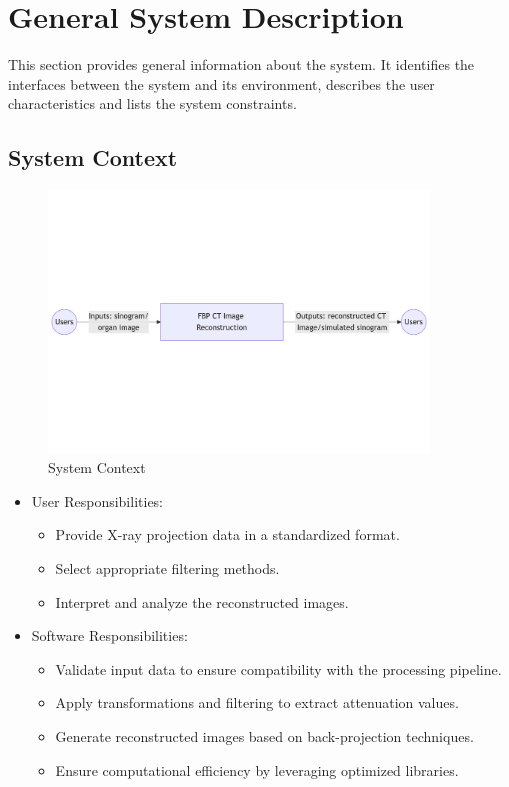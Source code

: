 \documentclass[12pt]{article}
\begin{document}
\section{General System Description} \label{general description}

This section provides general information about the system.  It identifies the
interfaces between the system and its environment, describes the user
characteristics and lists the system constraints.

\subsection{System Context}
\begin{figure}[h!]
\begin{center}
 \includegraphics[width=0.9\textwidth]{SysConfig.png}
\caption{System Context}
\label{Fig_SystemContext}
\end{center}
\end{figure}


\begin{itemize}
\item User Responsibilities:
\begin{itemize}
\item Provide X-ray projection data in a standardized format.
\item Select appropriate filtering methods.
\item Interpret and analyze the reconstructed images.
\end{itemize}
\end{itemize}


\begin{itemize}
\item Software Responsibilities:
\begin{itemize}
\item Validate input data to ensure compatibility with the processing pipeline.
\item Apply transformations and filtering to extract attenuation values.
\item Generate reconstructed images based on back-projection techniques.
\item Ensure computational efficiency by leveraging optimized libraries.
\end{itemize}
\end{itemize}
\end{document}
